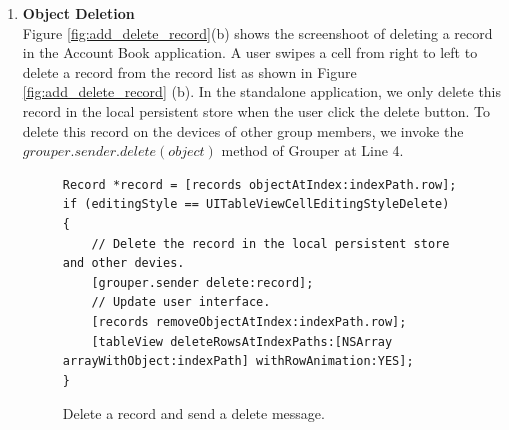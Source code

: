 \documentclass[a4paper,11pt]{report}
\begin{document}
\begin{enumerate}
The standalone application has the code from Line 2 to Line 8 in Figure \ref{fig:create_record}.
To share this record with other group members, we invoke the $grouper.sender.update()$ method of Grouper at Line 11 after saving the record in the local persistent store.

\begin{figure}
\begin{lstlisting}[frame=none language=Objective-C] 
// Save a record object to the application local persistent store.
Record *record = [dao.recordDao saveWithMoney:money
                                       remark:_remarkTextView.text
                                         time:_selectedTime
                               classification:_selectedClassification
                                      account:_selectedAccount
                                         shop:_selectedShop
                                        photo:photo];

// Invoke grouper.sender.update() method to send an update message.
[grouper.sender update:record];
\end{lstlisting}
\caption{Create a new record and send an update message.}
\label{fig:create_record}
\end{figure}

The method $grouper.sender.updated()$ divides a record into several shares and uploads them to multiple untrusted servers.
This method is also suitable for updating a record.
We can not ensure that other grouper members can synchronize this object successfully, because it has only been uploaded to multiple untrusted server
\\

\item \textbf{Object Deletion} \\

Figure \ref{fig:add_delete_record}(b) shows the screenshoot of deleting a record in the Account Book application. 
A user swipes a cell from right to left to delete a record from the record list as shown in Figure \ref{fig:add_delete_record} (b).
In the standalone application, we only delete this record in the local persistent store when the user click the delete button.
To delete this record on the devices of other group members, we invoke the $grouper.sender.delete(object)$ method of Grouper at Line 4.

\begin{figure}
\begin{lstlisting}[frame=none language=Objective-C] 
Record *record = [records objectAtIndex:indexPath.row];
if (editingStyle == UITableViewCellEditingStyleDelete) {
    // Delete the record in the local persistent store and other devies.
    [grouper.sender delete:record];
    // Update user interface.
    [records removeObjectAtIndex:indexPath.row];
    [tableView deleteRowsAtIndexPaths:[NSArray arrayWithObject:indexPath] withRowAnimation:YES];
}	
\end{lstlisting}
\caption{Delete a record and send a delete message.}
\label{fig:delete_record}
\end{figure}


\end{enumerate}
\end{document}
